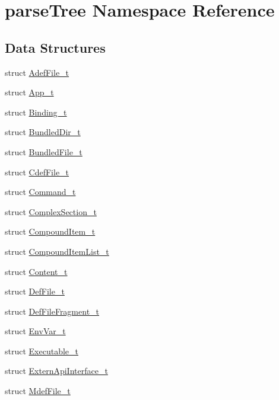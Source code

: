 \hypertarget{namespaceparse_tree}{}\section{parse\+Tree Namespace Reference}
\label{namespaceparse_tree}
\subsection*{Data Structures}
\begin{DoxyCompactItemize}
\item 
struct \hyperlink{structparse_tree_1_1_adef_file__t}{Adef\+File\+\_\+t}
\item 
struct \hyperlink{structparse_tree_1_1_app__t}{App\+\_\+t}
\item 
struct \hyperlink{structparse_tree_1_1_binding__t}{Binding\+\_\+t}
\item 
struct \hyperlink{structparse_tree_1_1_bundled_dir__t}{Bundled\+Dir\+\_\+t}
\item 
struct \hyperlink{structparse_tree_1_1_bundled_file__t}{Bundled\+File\+\_\+t}
\item 
struct \hyperlink{structparse_tree_1_1_cdef_file__t}{Cdef\+File\+\_\+t}
\item 
struct \hyperlink{structparse_tree_1_1_command__t}{Command\+\_\+t}
\item 
struct \hyperlink{structparse_tree_1_1_complex_section__t}{Complex\+Section\+\_\+t}
\item 
struct \hyperlink{structparse_tree_1_1_compound_item__t}{Compound\+Item\+\_\+t}
\item 
struct \hyperlink{structparse_tree_1_1_compound_item_list__t}{Compound\+Item\+List\+\_\+t}
\item 
struct \hyperlink{structparse_tree_1_1_content__t}{Content\+\_\+t}
\item 
struct \hyperlink{structparse_tree_1_1_def_file__t}{Def\+File\+\_\+t}
\item 
struct \hyperlink{structparse_tree_1_1_def_file_fragment__t}{Def\+File\+Fragment\+\_\+t}
\item 
struct \hyperlink{structparse_tree_1_1_env_var__t}{Env\+Var\+\_\+t}
\item 
struct \hyperlink{structparse_tree_1_1_executable__t}{Executable\+\_\+t}
\item 
struct \hyperlink{structparse_tree_1_1_extern_api_interface__t}{Extern\+Api\+Interface\+\_\+t}
\item 
struct \hyperlink{structparse_tree_1_1_mdef_file__t}{Mdef\+File\+\_\+t}

\end{DoxyCompactItemize}
